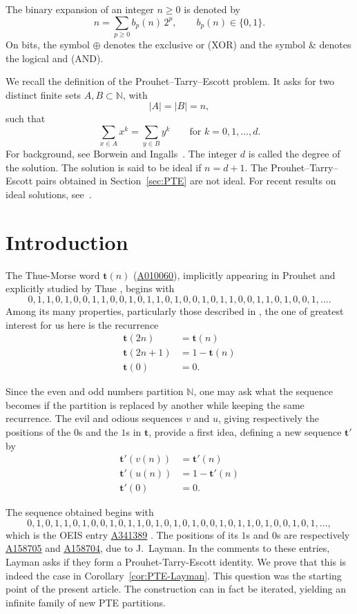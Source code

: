 \documentclass[12pt,reqno]{article}
\newcommand{\seqnum}[1]{\href{https://oeis.org/#1}{\rm \underline{#1}}}
\newcommand{\N}{\mathbb{N}}
\newcommand{\tm}{\mathbf{t}}
\theoremstyle{plain}
\theoremstyle{definition}
\begin{document}
The binary expansion of an integer $n \ge 0$ is denoted by
\[
  n = \sum_{p \ge 0} b_p(n)\, 2^p, \qquad b_p(n) \in \{0,1\}.
\]
On bits, the symbol $\oplus$ denotes the exclusive or (XOR) and
the symbol $\&$ denotes the logical and (AND).

We recall the definition of the Prouhet--Tarry--Escott problem. It asks
for two distinct finite sets \(A,B\subset \N\), with
\[
  |A|=|B|=n,
\]
such that
\[
  \sum_{x\in A} x^k=\sum_{y\in B} y^k
  \qquad \text{for } k=0,1,\ldots,d.
\]
For background, see Borwein and Ingalls~\cite{BorweinIngalls1994}.
The integer \(d\) is called the degree of the solution. The solution is
said to be ideal if \(n=d+1\). The Prouhet--Tarry--Escott pairs obtained
in Section~\ref{sec:PTE} are not ideal. For recent results on ideal
solutions, see~\cite{CMSV2024}.

\section{Introduction}

The Thue-Morse word $\tm(n)$ (\seqnum{A010060}), implicitly appearing
in Prouhet \cite{Prouhet1851} and explicitly studied by Thue
\cite{Thue1906,Thue1912}, begins with
\[
  0, 1, 1, 0, 1, 0, 0, 1, 1, 0, 0, 1, 0, 1, 1, 0,
  1, 0, 0, 1, 0, 1, 1, 0, 0, 1, 1, 0, 1, 0, 0, 1, \dots.
\]
Among its many properties, particularly those described in
\cite{AlloucheShallit1999}, the one of greatest interest for us here is the recurrence
\begin{align*}
\tm(2n) &= \tm(n) \\
\tm(2n+1) &= 1-\tm(n) \\
\tm(0) &= 0.
\end{align*}

Since the even and odd numbers partition $\N$, one may ask what the
sequence becomes if the partition is replaced by another while keeping
the same recurrence. The evil and
odious sequences $v$ and $u$, giving respectively the positions of
the $0$s and the $1$s in $\tm$, provide a first idea, defining a new
sequence $\tm'$ by
\begin{align*}
\tm'(v(n)) &= \tm'(n) \\
\tm'(u(n)) &= 1-\tm'(n) \\
\tm'(0) &= 0.
\end{align*}

The sequence obtained begins with
\[
0, 1, 0, 1, 1, 0, 1, 0, 0, 1, 0, 1, 1, 0, 1, 0,
1, 0, 1, 0, 0, 1, 0, 1, 1, 0, 1, 0, 0, 1, 0, 1, \dots,
\]
which is the OEIS entry \seqnum{A341389} \cite{OEIS}. The positions of its
$1$s and $0$s are respectively \seqnum{A158705} and \seqnum{A158704},
due to J.~Layman. In the comments to these entries,
Layman asks if they form a Prouhet-Tarry-Escott identity. We prove
that this is indeed the case in Corollary~\ref{cor:PTE-Layman}.
This question was the starting point of the present article. The
construction can in fact be iterated, yielding an infinite family of
new PTE partitions.
\end{document}
